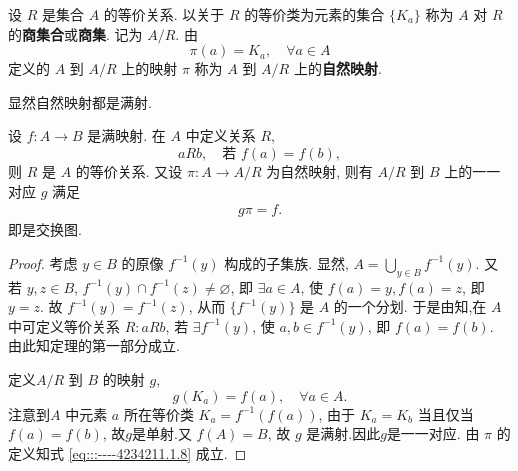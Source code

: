 \documentclass[../../main.tex]{subfiles}%
\begin{document}
\begin{definition}[商集和自然映射]
设 \( R \) 是集合 \( A \) 的等价关系. 以关于 \( R \) 的等价类为元素的集合 \( \{ K_a \} \) 称为 \( A \) 对 \( R \) 的\textbf{商集合}或\textbf{商集}. 记为 \( A/R \). 由
\[
\pi(a) = K_a,\quad \forall a \in A 
\]
定义的 \( A \) 到 \( A/R \) 上的映射 \( \pi \) 称为 \( A \) 到 \( A/R \) 上的\textbf{自然映射}.
\end{definition}
\begin{remark}
显然自然映射都是满射.
\end{remark}

\begin{theorem}\label{theorem:抽象代数--定理1.1.2}
设 \( f:A \to B \) 是满映射. 在 \( A \) 中定义关系 \( R \),
\[
aRb,\quad \text{若 } f(a) = f(b),
\]
则 \( R \) 是 \( A \) 的等价关系. 又设 \( \pi:A \to A/R \) 为自然映射, 则有 \( A/R \) 到 \( B \) 上的一一对应 \( g \) 满足
\begin{align}
g\pi = f. \label{eq:::----4234211.1.8}
\end{align}
即是交换图.
\end{theorem}
\begin{figure}[H]
\centering
\caption{}
\label{figure:交换图1}
\end{figure}
\begin{proof}

考虑 \( y \in B \) 的原像 \( f^{-1}(y) \) 构成的子集族. 显然, \( A = \bigcup_{y \in B} f^{-1}(y) \). 又若 \( y,z \in B \), \( f^{-1}(y) \cap f^{-1}(z) \neq \varnothing \), 即 \( \exists a \in A \), 使 \( f(a) = y, f(a) = z \), 即 \( y = z \). 故 \( f^{-1}(y) = f^{-1}(z) \), 从而 \( \{ f^{-1}(y) \} \) 是 \( A \) 的一个分划. 于是由知,在 \( A \) 中可定义等价关系 \( R: aRb \), 若 \( \exists f^{-1}(y) \), 使 \( a,b \in f^{-1}(y) \), 即 \( f(a) = f(b) \). 由此知定理的第一部分成立.

定义\( A/R \) 到 \( B \) 的映射 \( g \),
\[
g(K_a) = f(a),\quad \forall a \in A.
\]
注意到\( A \) 中元素 \( a \) 所在等价类 \( K_a = f^{-1}(f(a)) \), 由于 \( K_a = K_b \) 当且仅当 \( f(a) = f(b) \), 故$g$是单射.又 \( f(A) = B \), 故 \( g \) 是满射.因此$g$是一一对应. 由 \( \pi \) 的定义知式 \eqref{eq:::----4234211.1.8} 成立.

\end{proof}
\end{document}
